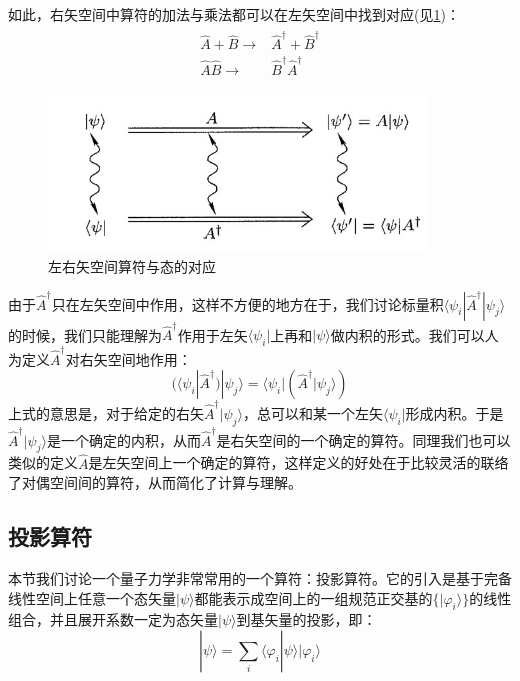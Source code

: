        如此，右矢空间中算符的加法与乘法都可以在左矢空间中找到对应(见\ref{fig:measureoperation})：
        \begin{align}
            \begin{split}
                \hat{A}+\hat{B}\rightarrow&\hat{A}^\dagger+\hat{B}^\dagger\\
                \hat{A}\hat{B}\rightarrow&\hat{B}^\dagger\hat{A}^\dagger
            \end{split}
        \end{align}
        
        \begin{figure}[H]
        \centering
        \includegraphics[width=0.9\textwidth]{figure/operation.jpg}
        \caption{左右矢空间算符与态的对应}
        \label{fig:measureoperation}
    \end{figure}
        \begin{remark}
            由于$\hat{A}^\dagger$只在左矢空间中作用，这样不方便的地方在于，我们讨论标量积$\langle\psi_i|\hat{A}^\dagger|\psi_j\rangle$的时候，我们只能理解为$\hat{A}^\dagger$作用于左矢$\langle\psi_i|$上再和$|\psi\rangle$做内积的形式。我们可以人为定义$\hat{A}^\dagger$对右矢空间地作用：
            \begin{equation}\label{equ2:2A}
                (\langle\psi_i|\hat{A}^\dagger)|\psi_j\rangle=\langle\psi_i|(\hat{A}^\dagger|\psi_j\rangle)
            \end{equation}
            上式的意思是，对于给定的右矢$\hat{A}^\dagger|\psi_j\rangle$，总可以和某一个左矢$\langle\psi_i|$形成内积。于是$\hat{A}^\dagger|\psi_j\rangle$是一个确定的内积，从而$\hat{A}^\dagger$是右矢空间的一个确定的算符。同理我们也可以类似的定义$\hat{A}$是左矢空间上一个确定的算符，这样定义的好处在于比较灵活的联络了对偶空间间的算符，从而简化了计算与理解。
        \end{remark}
    \subsection{投影算符}
    本节我们讨论一个量子力学非常常用的一个算符：投影算符。它的引入是基于完备线性空间上任意一个态矢量$|\psi\rangle$都能表示成空间上的一组规范正交基的$\{|\varphi_i\rangle\}$的线性组合，并且展开系数一定为态矢量$|\psi\rangle$到基矢量的投影，即：
    \begin{equation}
        |\psi\rangle=\sum_i\langle\varphi_i|\psi\rangle|\varphi_i\rangle
    \end{equation}
    

